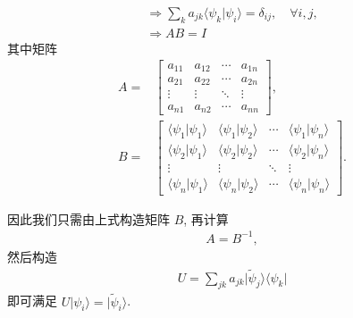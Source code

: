 \documentclass{assignment}
\begin{document}
\begin{sol}
\begin{gather}
        \Longrightarrow\sum_ka_{jk}\langle\psi_k\vert\psi_i\rangle=\delta_{ij},\quad\forall i,j,\\
        \Longrightarrow AB=I
    \end{gather}
    其中矩阵
    \begin{align}
        A=&\begin{bmatrix}
            a_{11}&a_{12}&\cdots&a_{1n}\\
            a_{21}&a_{22}&\cdots&a_{2n}\\
            \vdots&\vdots&\ddots&\vdots\\
            a_{n1}&a_{n2}&\cdots&a_{nn}
        \end{bmatrix},\\
        B=&\begin{bmatrix}
            \langle\psi_1\vert\psi_1\rangle&\langle\psi_1\vert\psi_2\rangle&\cdots&\langle\psi_1\vert\psi_n\rangle\\
            \langle\psi_2\vert\psi_1\rangle&\langle\psi_2\vert\psi_2\rangle&\cdots&\langle\psi_2\vert\psi_n\rangle\\
            \vdots&\vdots&\ddots&\vdots\\
            \langle\psi_n\vert\psi_1\rangle&\langle\psi_n\vert\psi_2\rangle&\cdots&\langle\psi_n\vert\psi_n\rangle
        \end{bmatrix}.
    \end{align}

    因此我们只需由上式构造矩阵 $B$, 再计算
    \begin{align}
        A=B^{-1},
    \end{align}
    然后构造
    \begin{align}
        U=\sum_{jk}a_{jk}\lvert\tilde{\psi}_j\rangle\langle\psi_k\rvert
    \end{align}
    即可满足 $U\lvert\psi_i\rangle=\lvert\tilde{\psi}_i\rangle$.
\end{sol}
\end{document}

